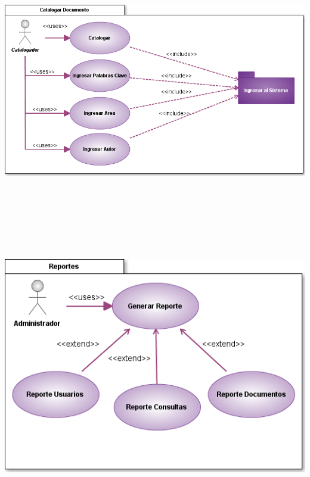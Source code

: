 \documentclass[]{article}
\begin{document}
	\begin{minipage}[c]{1\linewidth}
		\centering
		\includegraphics[width=17cm, height=14cm]{casosUso/CU_CatalogarDocumento}
	\end{minipage}
	
	\begin{minipage}[c]{1\linewidth}
		\centering
		\includegraphics[scale=.7]{casosUso/CU_Reportes}
	\end{minipage}
	
\end{document}
